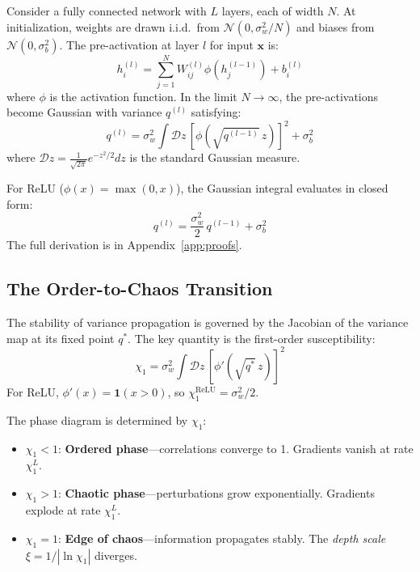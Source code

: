 \documentclass[10pt]{article}
\begin{document}
Consider a fully connected network with $L$ layers, each of width $N$.
At initialization, weights are drawn i.i.d.\ from $\mathcal{N}(0, \sigma_w^2/N)$ and biases from $\mathcal{N}(0, \sigma_b^2)$.
The pre-activation at layer $l$ for input $\mathbf{x}$ is:
\begin{equation}
    h_i^{(l)} = \sum_{j=1}^{N} W_{ij}^{(l)} \phi(h_j^{(l-1)}) + b_i^{(l)}
\end{equation}
where $\phi$ is the activation function.
In the limit $N \to \infty$, the pre-activations become Gaussian with variance $q^{(l)}$ satisfying:
\begin{equation}
    q^{(l)} = \sigma_w^2 \int \mathcal{D}z\, [\phi(\sqrt{q^{(l-1)}}\, z)]^2 + \sigma_b^2
    \label{eq:variance-map}
\end{equation}
where $\mathcal{D}z = \frac{1}{\sqrt{2\pi}} e^{-z^2/2} dz$ is the standard Gaussian measure.

For ReLU ($\phi(x) = \max(0,x)$), the Gaussian integral evaluates in closed form:
\begin{equation}
    q^{(l)} = \frac{\sigma_w^2}{2}\, q^{(l-1)} + \sigma_b^2
    \label{eq:relu-variance}
\end{equation}
The full derivation is in Appendix~\ref{app:proofs}.

\subsection{The Order-to-Chaos Transition}

The stability of variance propagation is governed by the Jacobian of the variance map at its fixed point $q^*$.
The key quantity is the first-order susceptibility:
\begin{equation}
    \chi_1 = \sigma_w^2 \int \mathcal{D}z\, [\phi'(\sqrt{q^*}\, z)]^2
    \label{eq:chi1}
\end{equation}
For ReLU, $\phi'(x) = \mathbf{1}(x > 0)$, so $\chi_1^{\text{ReLU}} = \sigma_w^2/2$.

The phase diagram is determined by $\chi_1$:
\begin{itemize}[nosep]
    \item $\chi_1 < 1$: \textbf{Ordered phase}---correlations converge to 1. Gradients vanish at rate $\chi_1^L$.
    \item $\chi_1 > 1$: \textbf{Chaotic phase}---perturbations grow exponentially. Gradients explode at rate $\chi_1^L$.
    \item $\chi_1 = 1$: \textbf{Edge of chaos}---information propagates stably. The \emph{depth scale} $\xi = 1/|\ln \chi_1|$ diverges.
\end{itemize}
\end{document}
